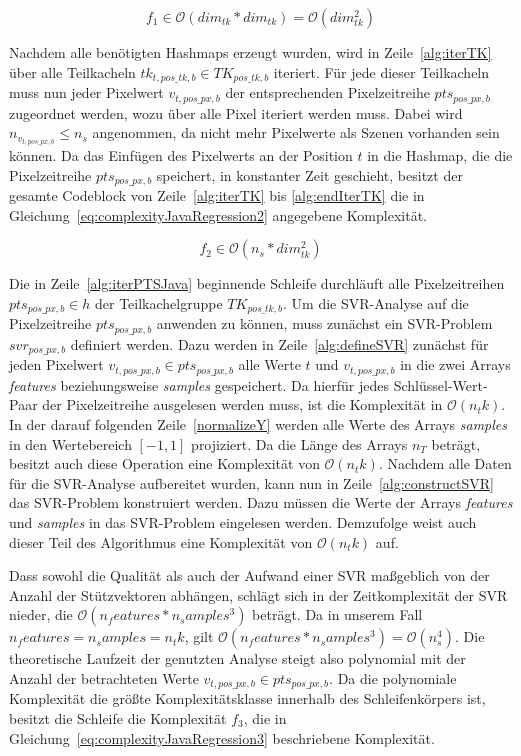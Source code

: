 \begin{equation} \label{eq:complexityJavaRegression1}
f_1 \in \mathcal{O}(dim_{tk} * dim_{tk}) = \mathcal{O}(dim_{tk}^2)
\end{equation}

Nachdem alle benötigten Hashmaps erzeugt wurden, wird in Zeile~\ref{alg:iterTK} über alle Teilkacheln $tk_{t, pos\_{tk}, b} \in TK_{pos\_{tk}, b}$ iteriert. Für jede dieser Teilkacheln muss nun jeder Pixelwert $v_{t, pos\_px, b}$ der entsprechenden Pixelzeitreihe $pts_{pos\_px, b}$ zugeordnet werden, wozu über alle Pixel iteriert werden muss. Dabei wird $n_{v_{t, pos\_px, b}} \leq n_s$ angenommen, da nicht mehr Pixelwerte als Szenen vorhanden sein können. Da das Einfügen des Pixelwerts an der Position $t$ in die Hashmap, die die Pixelzeitreihe $pts_{pos\_px, b}$ speichert, in konstanter Zeit geschieht, besitzt der gesamte Codeblock von Zeile~\ref{alg:iterTK} bis \ref{alg:endIterTK} die in Gleichung~\ref{eq:complexityJavaRegression2} angegebene Komplexität.

\begin{equation} \label{eq:complexityJavaRegression2}
f_2 \in \mathcal{O}(n_{s} * dim_{tk}^2)
\end{equation}

Die in Zeile~\ref{alg:iterPTSJava} beginnende Schleife durchläuft alle Pixelzeitreihen $pts_{pos\_px, b} \in h$ der Teilkachelgruppe $TK_{pos\_tk, b}$. Um die SVR-Analyse auf die Pixelzeitreihe $pts_{pos\_px, b}$ anwenden zu können, muss zunächst ein SVR-Problem $svr_{pos\_{px}, b}$ definiert werden. Dazu werden in Zeile~\ref{alg:defineSVR} zunächst für jeden Pixelwert $v_{t, pos\_px, b} \in pts_{pos\_px, b}$ alle Werte $t$ und $v_{t, pos\_px, b}$ in die zwei Arrays \textit{features} beziehungsweise \textit{samples} gespeichert. Da hierfür jedes Schlüssel-Wert-Paar der Pixelzeitreihe ausgelesen werden muss, ist die Komplexität in $\mathcal{O}(n_tk)$. In der darauf folgenden Zeile~\ref{normalizeY} werden alle Werte des Arrays \textit{samples } in den Wertebereich $[-1, 1]$ projiziert. Da die Länge des Arrays $n_T$ beträgt, besitzt auch diese Operation eine Komplexität von $\mathcal{O}(n_tk)$. Nachdem alle Daten für die SVR-Analyse aufbereitet wurden, kann nun in Zeile~\ref{alg:constructSVR} das SVR-Problem konstruiert werden. Dazu müssen die Werte der Arrays \textit{features} und \textit{samples} in das SVR-Problem eingelesen werden. Demzufolge weist auch dieser Teil des Algorithmus eine Komplexität von $\mathcal{O}(n_tk)$ auf.

Dass sowohl die Qualität als auch der Aufwand einer SVR maßgeblich von der Anzahl der Stützvektoren abhängen, schlägt sich in der Zeitkomplexität der SVR nieder, die $\mathcal{O}(n_features * n_samples^3)$ beträgt. Da in unserem Fall $n_features = n_samples = n_tk$, gilt $\mathcal{O}(n_features * n_samples^3) = \mathcal{O}(n_{s}^4)$. Die theoretische Laufzeit der genutzten Analyse steigt also polynomial mit der Anzahl der betrachteten Werte  $v_{t, pos\_px, b} \in pts_{pos\_px, b}$. Da die polynomiale Komplexität die größte Komplexitätsklasse innerhalb des Schleifenkörpers ist, besitzt die Schleife die Komplexität $f_3$, die in Gleichung~\ref{eq:complexityJavaRegression3} beschriebene Komplexität.

